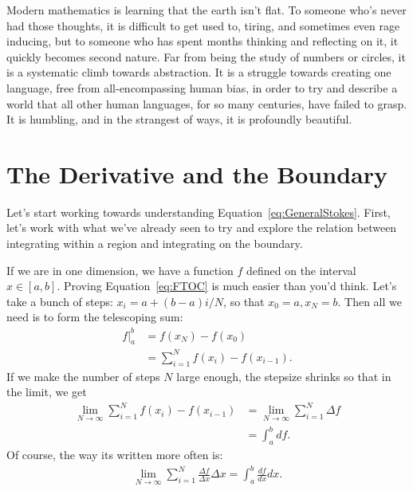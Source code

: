 \documentclass[../master.tex]{subfiles}
\begin{document}
	
	Modern mathematics is learning that the earth isn't flat. To someone who's never had those thoughts, it is difficult to get used to, tiring, and sometimes even rage inducing, but to someone who has spent months thinking and reflecting on it, it quickly becomes second nature. Far from being the study of numbers or circles, it is a systematic climb towards abstraction.  It is a struggle towards creating one language, free from all-encompassing human bias, in order to try and describe a world that all other human languages, for so many centuries, have failed to grasp. It is humbling, and in the strangest of ways, it is profoundly beautiful.



\section{The Derivative and the Boundary} %
\label{sec:the_derivative_and_the_boundary}


	Let's start working towards understanding Equation~\eqref{eq:GeneralStokes}. First, let's work with what we've already seen to try and explore the relation between integrating within a region and integrating on the boundary. 
	
	If we are in one dimension, we have a function $f$ defined on the interval $x \in [a,b]$. Proving Equation~\eqref{eq:FTOC} is much easier than you'd think. Let's take a bunch of steps: $x_i = a + (b-a)i/N$, so that $x_0 = a, x_N = b$. Then all we need is to form the telescoping sum:	
	\begin{align*}
		f\rvert^b_a &= f(x_N) - f(x_0) \\& = \sum_{i=1}^N f(x_{i})-f(x_{i-1}).
	\end{align*}
	If we make the number of steps $N$ large enough, the stepsize shrinks so that in the limit, we get
	\begin{align*}
		\lim_{N \rightarrow \infty} 	\sum_{i=1}^N f(x_{i})-f(x_{i-1}) & = \lim_{N \rightarrow \infty} 	\sum_{i=1}^N \Delta f \\ & = \int_a^b df.
	\end{align*}
	Of course, the way its written more often is:
	\begin{align*}
		\lim_{N \rightarrow \infty} 	\sum_{i=1}^N \frac{\Delta f}{\Delta x} \Delta x  = \int_{a}^{b} \frac{df}{dx} dx.
	\end{align*}
	
\end{document}
